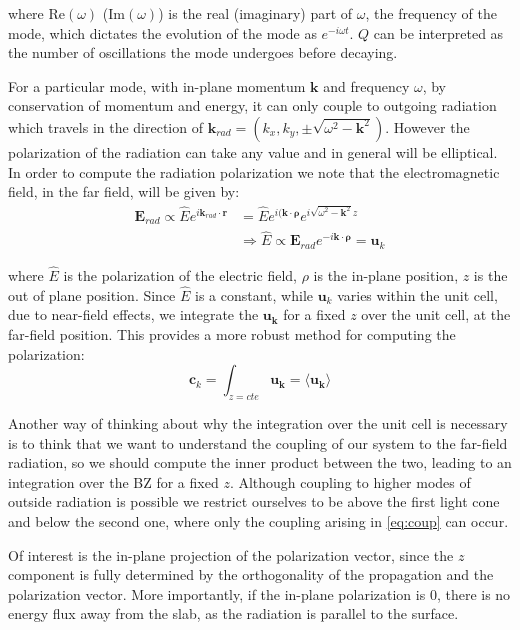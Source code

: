 \noindent where Re$(\omega)$ (Im$(\omega)$) is the real (imaginary) part of $\omega$, the frequency of the mode, which dictates the evolution of the mode as $e^{-i\omega t}$. $Q$ can be interpreted as the number of oscillations the mode undergoes before decaying.

For a particular mode, with in-plane momentum $\bm{k}$ and frequency $\omega$, by conservation of momentum and energy, it can only couple to outgoing radiation which travels in the direction of $\bm{k}_{rad} = (k_x, k_y, \pm\sqrt{\omega^2 - \bm{k}^2})$. However the polarization of the radiation can take any value and in general will be elliptical. In order to compute the radiation polarization we note that the electromagnetic field, in the far field, will be given by:
\begin{align}
  \bm{E}_{rad} \propto \hat{E} e^{i\bm{k}_{rad}\cdot \bm{r}}& = \hat{E} e^{i(\bm{k}\cdot \bm{\rho}} e^{i \sqrt{\omega^2 - \bm{k}^2} z}\\
& \Rightarrow \hat{E} \propto \bm{E}_{rad} e^{-i\bm{k}\cdot \bm{\rho}} = \bm{u}_k 
\end{align} 

\noindent where $\hat{E}$ is the polarization of the electric field, $\rho$ is the in-plane position, $z$ is the out of plane position. Since $\hat{E}$ is a constant, while $\bm{u}_k$ varies within the unit cell, due to near-field effects, we integrate the $\bm{u}_{\bm{k}}$ for a fixed $z$ over the unit cell, at the far-field position. This provides a more robust method for computing the polarization:
\begin{equation} \label{eq:coup}
  \bm{c}_k = \int_{z=cte} \bm{u}_{\bm{k}} = \langle \bm{u}_{\bm{k}}\rangle
\end{equation}

Another way of thinking about why the integration over the unit cell is necessary is to think that we want to understand the coupling of our system to the far-field radiation, so we should compute the inner product between the two, leading to an integration over the BZ for a fixed $z$. Although coupling to higher modes of outside radiation is possible we restrict ourselves to be above the first light cone and below the second one, where only the coupling arising in \ref{eq:coup} can occur. 

Of interest is the in-plane projection of the polarization vector, since the $z$ component is fully determined by the orthogonality of the propagation and the polarization vector. More importantly, if the in-plane polarization is $0$, there is no energy flux away from the slab, as the radiation is parallel to the surface.

